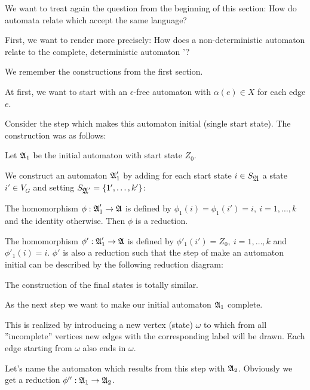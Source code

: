 We want to treat again the question from the beginning of this section: How do
automata relate which accept the same language?

First, we want to render more precisely: How does a non-deterministic automaton
 relate to the complete, deterministic automaton '?

We remember the constructions from the first section.

At first, we want to start with an $\epsilon$-free automaton with $\alpha(e)
\in X$ for each edge $e$.

Consider the step which makes this automaton initial (single start state). The
construction was as follows:

\missingfigure

Let $\mbox{$\mathfrak{A}$}_1$ be the initial automaton with start state $Z_0$.

We construct an automaton $\mbox{$\mathfrak{A}$}'_1$ by adding for each start state $i \in
S_{\mbox{$\mathfrak{A}$}}$ a state $i' \in V_G$ and setting $S_{\mbox{$\mathfrak{A}$}'} = \mbox{$\{1', \ldots,
k'\}$}$:

\missingfigure

The homomorphism $\phi : \mbox{$\mathfrak{A}$}'_1 \to \mbox{$\mathfrak{A}$}$ is defined by $\phi_1(i) =
\phi_1(i') = i,\ i = 1, \ldots, k$ and the identity otherwise. Then $\phi$ is a
reduction.

The homomorphism $\phi' : \mbox{$\mathfrak{A}$}_1' \to \mbox{$\mathfrak{A}$}$ is defined by $\phi'_1(i') =
Z_0,\ i = 1, \ldots, k$ and $\phi'_1(i) = i$. $\phi'$ is also a reduction such
that the step of make an automaton initial can be described by the following
reduction diagram:

\begin{center}
\end{center}

The construction of the final states is totally similar.

As the next step we want to make our initial automaton $\mbox{$\mathfrak{A}$}_1$ complete.

This is realized by introducing a new vertex (state) $\omega$ to which from all 
''incomplete'' vertices new edges with the corresponding label will be drawn.
Each edge starting from $\omega$ also ends in $\omega$.

Let's name the automaton which results from this step with $\mbox{$\mathfrak{A}$}_2$. Obviously
we get a reduction $\phi'' : \mbox{$\mathfrak{A}$}_1 \to \mbox{$\mathfrak{A}$}_2$.

